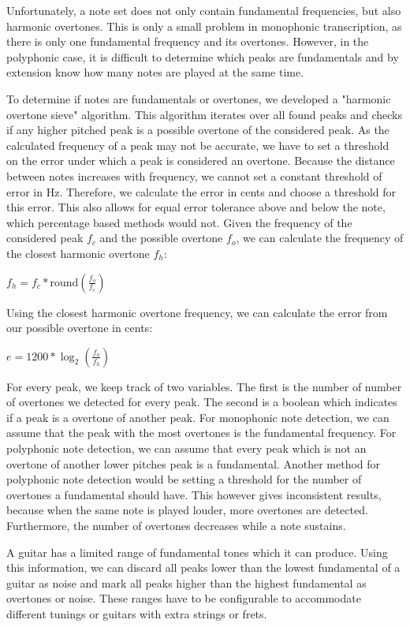 \documentclass[10pt,twocolumn]{article}
\begin{document}
Unfortunately, a note set does not only contain fundamental frequencies, but also harmonic overtones. This is only a small problem in monophonic transcription, as there is only one fundamental frequency and its overtones. However, in the polyphonic case, it is difficult to determine which peaks are fundamentals and by extension know how many notes are played at the same time.

To determine if notes are fundamentals or overtones, we developed a "harmonic overtone sieve" algorithm. This algorithm iterates over all found peaks and checks if any higher pitched peak is a possible overtone of the considered peak. As the calculated frequency of a peak may not be accurate, we have to set a threshold on the error under which a peak is considered an overtone. Because the distance between notes increases with frequency, we cannot set a constant threshold of error in Hz. Therefore, we calculate the error in cents and choose a threshold for this error. This also allows for equal error tolerance above and below the note, which percentage based methods would not. Given the frequency of the considered peak $f_c$ and the possible overtone $f_o$, we can calculate the frequency of the closest harmonic overtone $f_h$:
\begin{center}
    $f_h = f_c * \text{round}(\frac{f_o}{f_c})$
\end{center}
Using the closest harmonic overtone frequency, we can calculate the error from our possible overtone in cents:
\begin{center}
    $e = 1200 * \log_2(\frac{f_o}{f_h})$
\end{center}

For every peak, we keep track of two variables. The first is the number of number of overtones we detected for every peak. The second is a boolean which indicates if a peak is a overtone of another peak. For monophonic note detection, we can assume that the peak with the most overtones is the fundamental frequency. For polyphonic note detection, we can assume that every peak which is not an overtone of another lower pitches peak is a fundamental. Another method for polyphonic note detection would be setting a threshold for the number of overtones a fundamental should have. This however gives inconsistent results, because when the same note is played louder, more overtones are detected. Furthermore, the number of overtones decreases while a note sustains.

A guitar has a limited range of fundamental tones which it can produce. Using this information, we can discard all peaks lower than the lowest fundamental of a guitar as noise and mark all peaks higher than the highest fundamental as overtones or noise. These ranges have to be configurable to accommodate different tunings or guitars with extra strings or frets.
\end{document}
